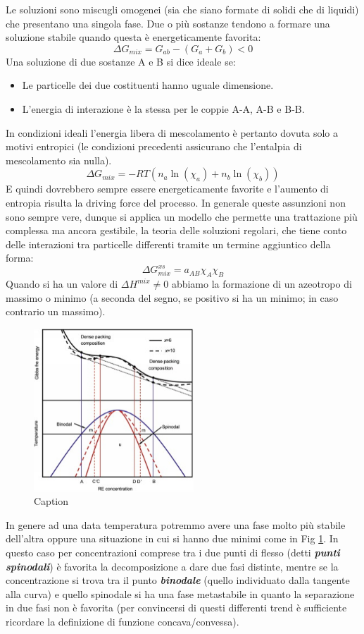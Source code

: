 Le soluzioni sono miscugli omogenei (sia che siano formate di solidi che di liquidi) che presentano una singola fase.
Due o più sostanze tendono a formare una soluzione stabile quando questa è energeticamente favorita:
\begin{equation}
    \Delta G_{mix}=G_{ab}-(G_a+G_b)<0
\end{equation}
Una soluzione di due sostanze A e B si dice ideale se:
\begin{itemize}
    \item Le particelle dei due costituenti hanno uguale dimensione.
    \item L'energia di interazione è la stessa per le coppie A-A, A-B e B-B.
\end{itemize}
In condizioni ideali l'energia libera di mescolamento è pertanto dovuta solo a motivi entropici (le condizioni precedenti assicurano che l'entalpia di mescolamento sia nulla).
\begin{equation}
    \Delta G_{mix}=-RT(n_a \ln(\chi_a)+n_b \ln(\chi_b))
\end{equation}
E quindi dovrebbero sempre essere energeticamente favorite e l'aumento di entropia risulta la driving force del processo.
In generale queste assunzioni non sono sempre vere, dunque si applica un modello che permette una trattazione più complessa ma ancora gestibile, la teoria delle soluzioni regolari, che tiene conto delle interazioni tra particelle differenti tramite un termine aggiuntico della forma:
\begin{equation}
    \Delta G^{xs}_{mix}=a_{AB}\chi_A\chi_B
\end{equation}
Quando si ha un valore di $\Delta H^{mix}\neq 0$ abbiamo la formazione di un azeotropo di massimo o minimo (a seconda del segno, se positivo si ha un minimo; in caso contrario un massimo).
\begin{figure}[h]
    \centering
    \includegraphics[width=6cm]{Diagrammi di fase/binodal.png}
    \caption{Caption}
    \label{binodal}
\end{figure}
In genere ad una data temperatura potremmo avere una fase molto più stabile dell'altra oppure una situazione in cui si hanno due minimi come in Fig \ref{binodal}. In questo caso per concentrazioni comprese tra i due punti di flesso (detti \textbf{\textit{punti spinodali}}) è favorita la decomposizione a dare due fasi distinte, mentre se la concentrazione si trova tra il punto \textbf{\textit{binodale}} (quello individuato dalla tangente alla curva) e quello spinodale si ha una fase metastabile in quanto la separazione in due fasi non è favorita (per convincersi di questi differenti trend è sufficiente ricordare la definizione di funzione concava/convessa).

